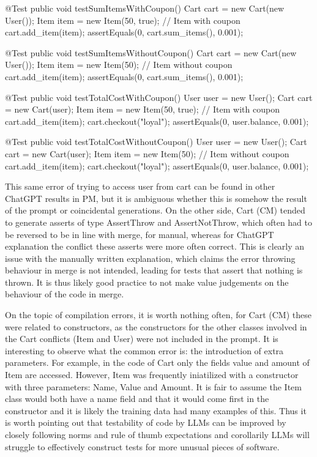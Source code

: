 \begin{response}
@Test
public void testSumItemsWithCoupon() {
    Cart cart = new Cart(new User());
    Item item = new Item(50, true); // Item with coupon
    cart.add_item(item);
    assertEquals(0, cart.sum_items(), 0.001);
}

@Test
public void testSumItemsWithoutCoupon() {
    Cart cart = new Cart(new User());
    Item item = new Item(50); // Item without coupon
    cart.add_item(item);
    assertEquals(0, cart.sum_items(), 0.001);
}

@Test
public void testTotalCostWithCoupon() {
    User user = new User();
    Cart cart = new Cart(user);
    Item item = new Item(50, true); // Item with coupon
    cart.add_item(item);
    cart.checkout("loyal");
    assertEquals(0, user.balance, 0.001);
}

@Test
public void testTotalCostWithoutCoupon() {
    User user = new User();
    Cart cart = new Cart(user);
    Item item = new Item(50); // Item without coupon
    cart.add_item(item);
    cart.checkout("loyal");
    assertEquals(0, user.balance, 0.001);
}
\end{response}
This same error of trying to access user from cart can be found in other ChatGPT results in PM, but it is ambiguous
whether this is somehow the result of the prompt or coincidental generations. On the other side, Cart (CM) tended to generate
asserts of type AssertThrow and AssertNotThrow, which often had to be reversed to be in line with merge, for manual, whereas for
ChatGPT explanation the conflict these asserts were more often correct. This is clearly an issue with the manually written explanation,
which claims the error throwing behaviour in merge is not intended, leading for tests that assert that nothing is thrown.
It is thus likely good practice to not make value judgements on the behaviour of the code in merge.

On the topic of compilation errors, it is worth nothing often, for Cart (CM) these were related to constructors, as the constructors
for the other classes involved in the Cart conflicts (Item and User) were not included in the prompt. It is interesting
to observe what the common error is: the introduction of extra parameters. For example, in the code of Cart only the fields
value and amount of Item are accessed. However, Item was frequently iniatilized with a constructor with three parameters: Name,
Value and Amount. It is fair to assume the Item class would both have a name field and that it would come first in the constructor
and it is likely the training data had many examples of this. Thus it is worth pointing out that testability of code by LLMs can be
improved by closely following norms and rule of thumb expectations and corollarily LLMs will struggle to effectively construct tests
for more unusual pieces of software.

